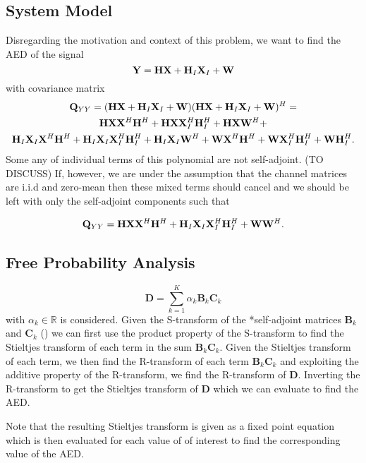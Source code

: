 \documentclass[12pt,a4paper]{report}
\begin{document}
\subsection{System Model}
Disregarding the motivation and context of this problem, we want to find the AED of the signal 
\begin{equation}
\mathbf{Y} = \mathbf{H}\mathbf{X} + \mathbf{H}_I \mathbf{X}_I + \mathbf{W}
\end{equation}
with covariance matrix 
\begin{gather*}
\mathbf{Q}_{YY} = (\mathbf{H}\mathbf{X} + \mathbf{H}_I \mathbf{X}_I + \mathbf{W})(\mathbf{H}\mathbf{X} + \mathbf{H}_I \mathbf{X}_I + \mathbf{W})^H = 
\\
\mathbf{H}\mathbf{X}\mathbf{X}^H\mathbf{H}^H + \mathbf{H}\mathbf{X}\mathbf{X}_I^H\mathbf{H}_I^H + \mathbf{H}\mathbf{X}\mathbf{W}^H +\\ \mathbf{H}_I \mathbf{X}_I \mathbf{X}^H\mathbf{H}^H + \mathbf{H}_I \mathbf{X}_I\mathbf{X}_I^H\mathbf{H}_I^H + \mathbf{H}_I \mathbf{X}_I\mathbf{W}^H + \mathbf{W}\mathbf{X}^H\mathbf{H}^H + \mathbf{W}\mathbf{X}_I^H\mathbf{H}_I^H + \mathbf{W}\mathbf{H}_I^H.
\end{gather*}
Some any of individual terms of this polynomial are not self-adjoint. (TO DISCUSS) If, however, we are under the assumption that the channel matrices are i.i.d and zero-mean then these mixed terms should cancel and we should be left with only the self-adjoint components such that

\begin{gather*}
\mathbf{Q}_{YY} =
\mathbf{H}\mathbf{X}\mathbf{X}^H\mathbf{H}^H + \mathbf{H}_I \mathbf{X}_I\mathbf{X}_I^H\mathbf{H}_I^H + \mathbf{W}\mathbf{W}^H.
\end{gather*}
\subsection{Free Probability Analysis}\label{decont_fpt}


\begin{equation}
\mathbf{D} = \sum_{k=1}^{K} \alpha_k \mathbf{B}_k \mathbf{C}_k
\end{equation}
with $\alpha_k \in \mathbb{R}$ is considered. Given the S-transform of the *self-adjoint matrices $\mathbf{B}_k $ and $\mathbf{C}_k$ (\cite{nica2006lectures}) we can first use the product property of the S-transform to find the Stieltjes transform of each term in the sum $\mathbf{B}_k \mathbf{C}_k$. Given the Stieltjes transform of each term, we then find the R-transform of each term $\mathbf{B}_k \mathbf{C}_k$ and exploiting the additive property of the R-transform, we find the R-transform of $\mathbf{D}$. Inverting the R-transform to get the Stieltjes transform of $\mathbf{D}$ which we can evaluate to find the AED.
\par
Note that the resulting Stieltjes transform is given as a fixed point equation which is then evaluated for each value of of interest to find the corresponding value of the AED. 
\end{document}
